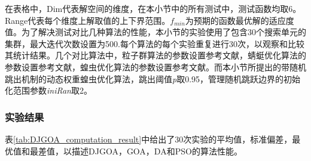 在表格中，Dim代表解空间的维度，在本小节中的所有测试中，测试函数均取6。Range代表每个维度上解取值的上下界范围。$f_{min}$为预期的函数最优解的适应度值。为了解决测试对比几种算法的性能，本小节的实验使用了包含30个搜索单元的集群，最大迭代次数设置为500.每个算法的每个实验重复进行30次，以观察和比较其统计结果。几个对比算法中，粒子群算法的参数设置参考文献\cite{kennedy1995particle}，蜻蜓优化算法的参数设置参考文献\cite{mirjalili2016dragonfly}，蝗虫优化算法的参数设置参考文献\cite{saremi2017grasshopper}。而本小节所提出的带随机跳出机制的动态权重蝗虫优化算法，跳出阈值\emph{p}取0.95，管理随机跳跃边界的初始化范围参数\emph{iniRan}取2。


\subsubsection{实验结果}
表\ref{tab:DJGOA_computation_result}中给出了30次实验的平均值，标准偏差，最优值和最差值，以描述DJGOA，GOA，DA和PSO的算法性能。

